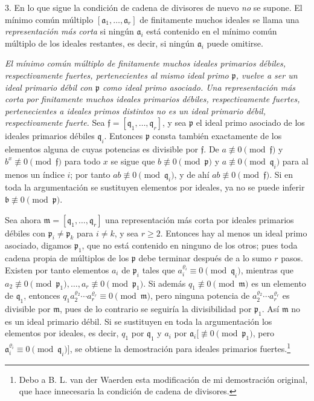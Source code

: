 \documentclass[11pt]{article}
\providecommand{\ma}{\mathfrak{a}}
\providecommand{\mb}{\mathfrak{b}}
\providecommand{\mf}{\mathfrak{f}}
\providecommand{\mm}{\mathfrak{m}}
\providecommand{\mpideal}{\mathfrak{p}}
\providecommand{\mq}{\mathfrak{q}}
\begin{document}
3. En lo que sigue la condición de cadena de divisores de nuevo \emph{no} se supone. El mínimo común múltiplo $[\ma_1,\ldots,\ma_r]$ de finitamente muchos ideales se llama una \emph{representación más corta} si ningún $\ma_i$ está contenido en el mínimo común múltiplo de los ideales restantes, es decir, si ningún $\ma_i$ puede omitirse.

\emph{El mínimo común múltiplo de finitamente muchos ideales primarios débiles, respectivamente fuertes, pertenecientes al mismo ideal primo $\mpideal$, vuelve a ser un ideal primario débil con $\mpideal$ como ideal primo asociado. Una representación más corta por finitamente muchos ideales primarios débiles, respectivamente fuertes, pertenecientes a ideales primos distintos no es un ideal primario débil, respectivamente fuerte.} Sea $\mf=[\mq_1,\ldots,\mq_r]$, y sea $\mpideal$ el ideal primo asociado de los ideales primarios débiles $\mq_i$. Entonces $\mpideal$ consta también exactamente de los elementos alguna de cuyas potencias es divisible por $\mf$. De $a\not\equiv0\pmod{\mf}$ y $b^x\not\equiv0\pmod{\mf}$ para todo $x$ se sigue que $b\not\equiv0\pmod{\mpideal}$ y $a\not\equiv0\pmod{\mq_i}$ para al menos un índice $i$; por tanto $ab\not\equiv0\pmod{\mq_i}$, y de ahí $ab\not\equiv0\pmod{\mf}$. Si en toda la argumentación se sustituyen elementos por ideales, ya no se puede inferir $\mb\not\equiv0\pmod{\mpideal}$.

Sea ahora $\mm=[\mq_1,\ldots,\mq_r]$ una representación más corta por ideales primarios débiles con $\mpideal_i\ne\mpideal_k$ para $i\ne k$, y sea $r\ge2$. Entonces hay al menos un ideal primo asociado, digamos $\mpideal_1$, que no está contenido en ninguno de los otros; pues toda cadena propia de múltiplos de los $\mpideal$ debe terminar después de a lo sumo $r$ pasos. Existen por tanto elementos $a_i$ de $\mpideal_i$ tales que $a_i^{\varrho_i}\equiv0\pmod{\mq_i}$, mientras que $a_2\not\equiv0\pmod{\mpideal_1},\ldots,a_r\not\equiv0\pmod{\mpideal_1}$. Si además $q_1\not\equiv0\pmod{\mm}$ es un elemento de $\mq_1$, entonces $q_1a_2^{\varrho_2}\cdots a_r^{\varrho_r}\equiv0\pmod{\mm}$, pero ninguna potencia de $a_2^{\varrho_2}\cdots a_r^{\varrho_r}$ es divisible por $\mm$, pues de lo contrario se seguiría la divisibilidad por $\mpideal_1$. Así $\mm$ no es un ideal primario débil. Si se sustituyen en toda la argumentación los elementos por ideales, es decir, $q_1$ por $\mq_1$ y $a_i$ por $\ma_i[\not\equiv0\pmod{\mpideal_1}$, pero $\ma_i^{\varrho_i}\equiv0\pmod{\mq_i}]$, se obtiene la demostración para ideales primarios fuertes.\footnote{Debo a B. L. van der Waerden esta modificación de mi demostración original, que hace innecesaria la condición de cadena de divisores.}
\end{document}
